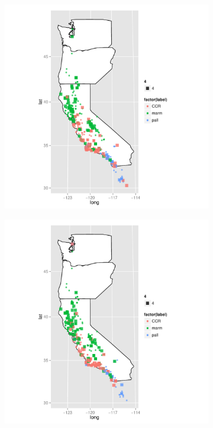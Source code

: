\documentclass{article}\usepackage{graphicx, color}
\begin{document}
\begin{figure}[t]
  \centering
  \begin{subfigure}[b]{0.5\textwidth}
    \centering
    \caption{}
    \includegraphics[width = \textwidth]{figure/multi-map1}
    \label{fig:multi-map1}
  \end{subfigure}%
  \begin{subfigure}[b]{0.5\textwidth}
    \centering
    \caption{}
    \includegraphics[width = \textwidth]{figure/multi-map2}
    \label{fig:multi-map2}
  \end{subfigure}\\


\end{figure}
\end{document}

